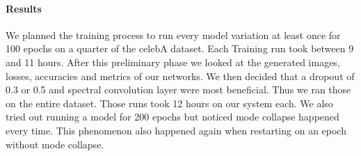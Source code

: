 \documentclass[12pt, a4paper]{article}
\begin{document}
\paragraph{Results}
We planned the training process to run every model variation at least once for 100 epochs on a quarter of the celebA dataset.
Each Training run took between 9 and 11 hours. After this preliminary phase we looked at the generated images, losses, accuracies and metrics of our networks.
We then decided that a dropout of 0.3 or 0.5 and spectral convolution layer were most beneficial.
Thus we ran those on the entire dataset. Those runs took 12 hours on our system each.
We also tried out running a model for 200 epochs but noticed mode collapse happened every time.
This phenomenon also happened again when restarting on an epoch without mode collapse.
\end{document}
